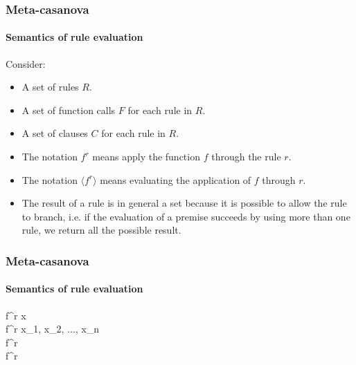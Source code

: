 \documentclass[mathserif,serif]{beamer}
\begin{document}
\begin{frame}
	\frametitle{Meta-casanova}
	\framesubtitle{Semantics of rule evaluation}
	
	Consider:
	\begin{itemize}
		\item A set of rules $R$.
		\item A set of function calls $F$ for each rule in $R$.
		\item A set of clauses $C$ for each rule in $R$.
		\item The notation $f^{r}$ means apply the function $f$ through the rule $r$.
		\item The notation  $\langle f^{r} \rangle$ means evaluating the application of $f$ through $r$.
		\item The result of a rule is in general a set because it is possible to allow the rule to branch, i.e. if the evaluation of a premise succeeds by using more than one rule, we return all the possible result.
	\end{itemize}
\end{frame}

\begin{frame}
	\frametitle{Meta-casanova}
	\framesubtitle{Semantics of rule evaluation}
	
	\begin{mathpar}
		{\langle f^{r} \rangle \Rightarrow \lbrace x \rbrace} \\
		
		{\langle f^{r} \rangle \Rightarrow \lbrace x_{1}, x_{2}, ..., x_{n} \rbrace} \\
		
		{\langle f^{r} \rangle \Rightarrow \emptyset} \\
		
		{\langle f^{r} \rangle \Rightarrow \emptyset}
	\end{mathpar}
\end{frame}
\end{document}
